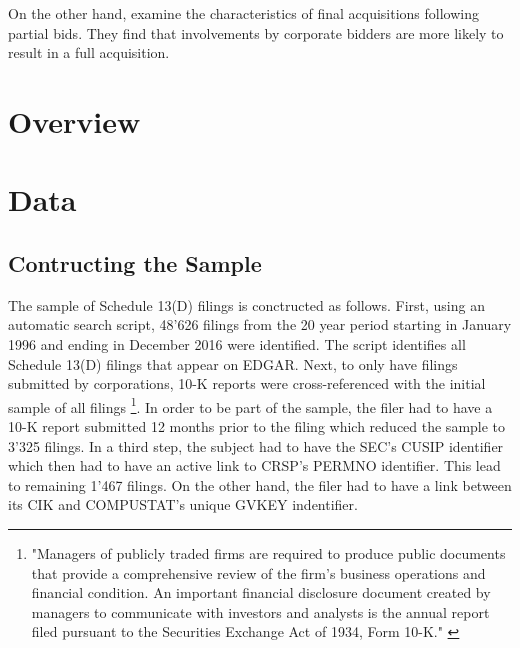 \documentclass[12pt]{article}
\begin{document}

On the other hand, \citet{Akhigbe2007} examine the characteristics of final acquisitions following partial bids. They find that involvements by corporate bidders are more likely to result in a full acquisition. 


\section{Overview}
\section{Data}

\subsection{Contructing the Sample}
The sample of Schedule 13(D) filings is conctructed as follows. First, using an automatic search script, 48'626 filings from the 20 year period starting in January 1996 and ending in December 2016 were identified.  The script identifies all Schedule 13(D) filings that appear on EDGAR. Next, to only have filings submitted by corporations, 10-K reports were cross-referenced with the initial sample of all filings \footnote{"Managers of publicly traded firms are required to produce public documents that provide a comprehensive review of the firm’s business operations and financial condition. An important financial disclosure document created by managers to communicate with investors and analysts is the annual report filed pursuant to the Securities Exchange Act of 1934, Form 10-K." \citep{Loughran2014}}. In order to be part of the sample, the filer had to have a 10-K report submitted 12 months prior to the filing which reduced the sample to 3'325 filings. In a third step, the subject had to have the SEC's CUSIP identifier which then had to have an active link to CRSP's PERMNO identifier. This lead to remaining 1'467 filings.
On the other hand, the filer had to have a link between its CIK and COMPUSTAT's unique GVKEY indentifier. 
\end{document}
